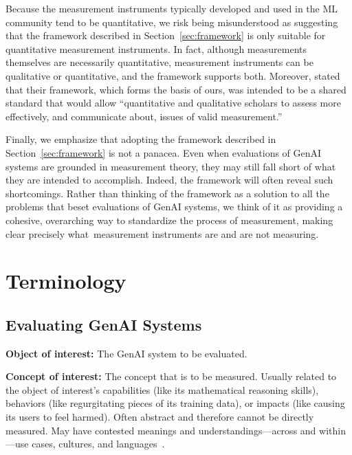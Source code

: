 \documentclass{article}
\begin{document}
Because the measurement instruments typically developed and used in the ML community tend to be quantitative, we risk being misunderstood as suggesting that the framework described in Section~\ref{sec:framework} is only suitable for quantitative measurement instruments. In fact, although measurements themselves are necessarily quantitative, measurement instruments can be qualitative or quantitative, and the framework supports both.
Moreover, \citet{adcock2001measurement} stated that their framework, which forms the basis of ours, was intended to be a shared standard that would allow ``quantitative and qualitative scholars to assess more effectively, and communicate about, issues of valid measurement.''

Finally, we emphasize that adopting the framework described in Section~\ref{sec:framework} is not a panacea. Even when evaluations of GenAI systems are grounded in measurement theory, they may still fall short of what they are intended to accomplish. Indeed, the framework will often reveal such shortcomings. Rather than thinking of the framework as a solution to all the problems that beset evaluations of GenAI systems, we think of it as providing a cohesive, overarching way to standardize the process of measurement, making clear precisely what~measurement instruments are and are not  measuring.




\newpage
\appendix

\section{Terminology}
\label{sec:terminology}

\subsection{Evaluating GenAI Systems}

\textbf{Object of interest:} The GenAI system to be evaluated.

\textbf{Concept of interest:} The concept that is to be measured. Usually related to 
the object of interest's capabilities (like its mathematical reasoning skills), behaviors (like regurgitating pieces of its training data), or impacts (like causing its users to feel harmed). Often abstract and therefore cannot be directly measured. May have contested meanings and understandings---across and within---use cases, cultures, and languages~\citep{mulligan2016privacy, mulliganfairness}.
\end{document}
